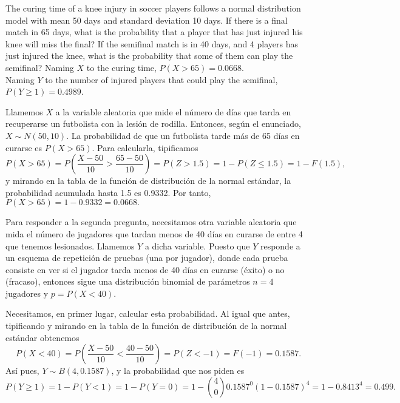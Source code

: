 {The curing time of a knee injury in soccer players follows a normal distribution model with mean 50 days and standard deviation 10 days.
If there is a final match in 65 days, what is the probability that a player that has just injured his knee will miss the final?
If the semifinal match is in 40 days, and 4 players has just injured the knee, what is the probability that some of them can play the semifinal?
}
{Naming $X$ to the curing time, $P(X>65)=0.0668$.\\
Naming $Y$ to the number of injured players that could play the semifinal, $P(Y\geq 1)=0.4989$.
}
{Llamemos $X$ a la variable aleatoria que mide el número de días que tarda en recuperarse un futbolista con la lesión de rodilla. Entonces,
según el enunciado, $X\sim N(50,10)$. La probabilidad de que un futbolista tarde más de 65 días en curarse es $P(X>65)$. Para calcularla, tipificamos
\[
P(X>65)=P(\frac{X-50}{10}>\frac{65-50}{10})=P(Z>1.5)=1-P(Z\leq 1.5)=1-F(1.5),
\]
y mirando en la tabla de la función de distribución de la normal estándar, la probabilidad acumulada hasta 1.5 es 0.9332. Por tanto,
$P(X>65)=1-0.9332=0.0668.$

Para responder a la segunda pregunta, necesitamos otra variable aleatoria que mida el número de jugadores que tardan menos de 40 días en
curarse de entre 4 que tenemos lesionados. Llamemos $Y$ a dicha variable. Puesto que $Y$ responde a un esquema de repetición de pruebas (una
por jugador), donde cada prueba consiste en ver si el jugador tarda menos de 40 días en curarse (éxito) o no (fracaso), entonces sigue una
distribución binomial de parámetros $n=4$ jugadores y $p=P(X<40)$.

Necesitamos, en primer lugar, calcular esta probabilidad. Al igual que antes, tipificando y mirando en la tabla de la función de
distribución de la normal estándar obtenemos
\[
P(X<40)=P(\frac{X-50}{10}<\frac{40-50}{10})=P(Z<-1)=F(-1)=0.1587.
\]
Así pues, $Y\sim B(4,0.1587)$, y la probabilidad que nos piden es
\[
P(Y\geq 1)=1-P(Y<1)=1-P(Y=0)=1-\binom{4}{0}0.1587^0 (1-0.1587)^4=1-0.8413^4=0.499.
\]
}


